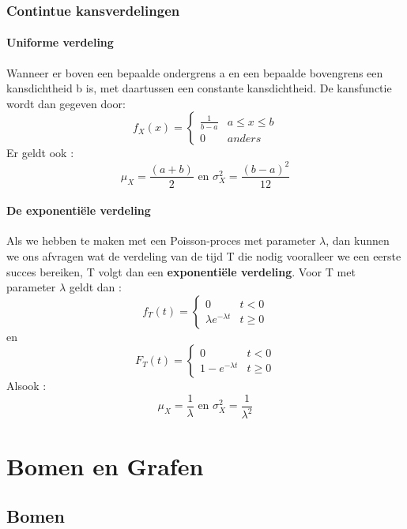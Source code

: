 \documentclass{report}
\begin{document}
	  		\subsection{Contintue kansverdelingen}
	  			\subsubsection{Uniforme verdeling}
	  				Wanneer er boven een bepaalde ondergrens a en een bepaalde bovengrens een kansdichtheid b is, met daartussen een constante kansdichtheid. De kansfunctie wordt dan gegeven door: 
	  				\[f_X(x) = \begin{cases} 
	  				\frac{1}{b - a} & a \leq x\leq b \\
	  				0 & anders
	  				\end{cases}
	  				\]
	  				Er geldt ook : 
	  				\[	\mu_X = \frac{(a+b)}{2} \textrm{ en } \sigma_X^2 = \frac{(b - a)^2}{12}\]
	  			\subsubsection{De exponentiële verdeling}
	  				Als we hebben te maken met een Poisson-proces met parameter \(\lambda\), dan kunnen we ons afvragen wat de verdeling van de tijd T die nodig vooralleer we een eerste succes bereiken, T volgt dan een \textbf{exponentiële verdeling}. Voor T met parameter \(\lambda\) geldt dan : 
	  				\[f_T(t) = \begin{cases}
	  					0 & t < 0 \\
	  					\lambda e^{-\lambda t} & t \geq 0
	  				\end{cases}\]
	  				en 
	  				\[F_T(t) = \begin{cases}
	  				0 & t < 0 \\
	  				1 - e^{-\lambda t} & t \geq 0
	  				\end{cases}\]
	  				Alsook : 
	  				\[	\mu_X = \frac{1}{\lambda} \textrm{ en } \sigma_X^2 = \frac{1}{\lambda^2}\]
	\chapter{Bomen en Grafen}
	  	\section{Bomen}
\end{document}
